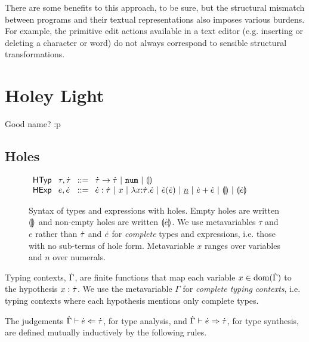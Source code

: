 \documentclass{llncs}
\begin{document}
There are some benefits to this approach, to be sure, but the structural mismatch between programs and their textual representations  also imposes various burdens. 
For example, the primitive edit actions available in a text editor (e.g. inserting or deleting a character or word)  do not always correspond to  sensible structural transformations. 




\section{Holey Light}
Good name? :p
\subsection{Holes}
\begin{figure}
$\arraycolsep=4pt\begin{array}{lllllll}
\mathsf{HTyp} & \tau,\htau & ::= & 
  \tarr{\htau}{\htau} ~\vert~ 
  \tnum ~\vert~
  \tehole\\
\mathsf{HExp} & e,\hexp & ::= & 
  \hexp : \htau ~\vert~
  x ~\vert~ 
  \hlam{x}{\htau}{\hexp} ~\vert~ 
  \hap{\hexp}{\hexp} ~\vert~
  \hnum{n} ~\vert~
  \hadd{\hexp}{\hexp} ~\vert~
  \hehole ~\vert~
  \hhole{\hexp}
\end{array}$
\caption{Syntax of types and expressions with holes. Empty holes are written $\llparenthesis\rrparenthesis$ and non-empty holes are written $\llparenthesis\dot{e}\rrparenthesis$. We use metavariables $\tau$ and $e$ rather than $\dot{\tau}$ and $\dot{e}$ for \emph{complete} types and expressions, i.e. those with no sub-terms of hole form. Metavariable $x$ ranges over variables and $n$ over numerals.}
\label{fig:hexp-syntax}
\end{figure}

Typing contexts, $\dot{\Gamma}$, are finite functions that map each variable $x \in \text{dom}(\dot{\Gamma})$ to the hypothesis $x : \dot{\tau}$. We use the metavariable $\Gamma$ for \emph{complete typing contexts}, i.e. typing contexts where each hypothesis mentions only complete types.

The judgements $\dot{\Gamma} \vdash \dot{e} \Leftarrow \dot{\tau}$, for type analysis, and $\dot{\Gamma} \vdash \dot{e} \Rightarrow \dot{\tau}$, for type synthesis, are defined mutually inductively by the following rules.
\end{document}
